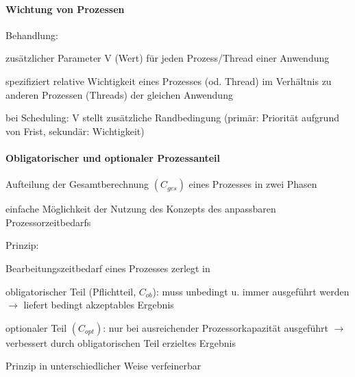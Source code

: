 \documentclass[a4paper]{article}
\begin{document}
\begin{multicols}{3}
    \paragraph{Wichtung von Prozessen}

    Behandlung:

    \begin{itemize*}
        \item
        zusätzlicher Parameter V (Wert) für jeden Prozess/Thread einer
        Anwendung
        \item
        spezifiziert relative Wichtigkeit eines Prozesses (od. Thread) im
        Verhältnis zu anderen Prozessen (Threads) der gleichen Anwendung
        \item
        bei Scheduling: V stellt zusätzliche Randbedingung (primär: Priorität
        aufgrund von Frist, sekundär: Wichtigkeit)
    \end{itemize*}


    \paragraph{Obligatorischer und optionaler
        Prozessanteil}

    \begin{itemize*}
        \item
        Aufteilung der Gesamtberechnung $(C_{ges})$ eines Prozesses in
        zwei Phasen
        \item
        einfache Möglichkeit der Nutzung des Konzepts des anpassbaren
        Prozessorzeitbedarfs
        \item
        Prinzip:
        \begin{itemize*}
            \item Bearbeitungszeitbedarf eines Prozesses zerlegt in \begin{enumerate*} \item obligatorischer Teil (Pflichtteil, $C_{ob}$): muss unbedingt u. immer ausgeführt werden $\rightarrow$ liefert bedingt akzeptables Ergebnis \item optionaler Teil $(C_{opt})$: nur bei ausreichender Prozessorkapazität ausgeführt $\rightarrow$ verbessert durch obligatorischen Teil erzieltes Ergebnis \end{enumerate*}
            \item Prinzip in unterschiedlicher Weise verfeinerbar
        \end{itemize*}
    \end{itemize*}



\end{multicols}
\end{document}

